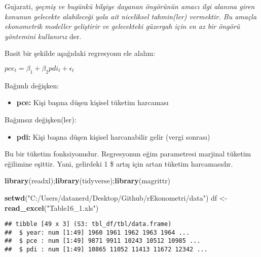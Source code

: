 \documentclass[
]{book}
\newenvironment{Shaded}{\begin{snugshade}}{\end{snugshade}}
\newcommand{\KeywordTok}[1]{\textcolor[rgb]{0.13,0.29,0.53}{\textbf{#1}}}
\newcommand{\NormalTok}[1]{#1}
\newcommand{\OperatorTok}[1]{\textcolor[rgb]{0.81,0.36,0.00}{\textbf{#1}}}
\newcommand{\StringTok}[1]{\textcolor[rgb]{0.31,0.60,0.02}{#1}}
\providecommand{\tightlist}{%
  \setlength{\itemsep}{0pt}\setlength{\parskip}{0pt}}
\begin{document}
Gujarati, \emph{geçmiş ve bugünkü bilgiye dayanan öngörünün amacı ilgi alanına giren konunun gelecekte alabileceği yola ait niceliksel tahmin(ler) vermektir. Bu amaçla ekonometrik modeller geliştirir ve gelecekteki güzergah için en az bir öngörü yöntemini kullanırız} der.

Basit bir şekilde aşağıdaki regresyonu ele alalım:

\(pce_t = \beta_1 + \beta_2pdi_t + \epsilon_t\)

Bağımlı değişken:

\begin{itemize}
\tightlist
\item
  \textbf{pce:} Kişi başına düşen kişisel tüketim harcaması
\end{itemize}

Bağımsız değişken(ler):

\begin{itemize}
\tightlist
\item
  \textbf{pdi:} Kişi başına düşen kişisel harcanabilir gelir (vergi sonrası)
\end{itemize}

Bu bir tüketim fonksiyonudur. Regresyonun eğim parametresi marjinal tüketim eğilimine eşittir. Yani, gelirdeki 1 \$ artış için artan tüketim harcamasıdır.

\begin{Shaded}
\begin{Highlighting}[]
\KeywordTok{library}\NormalTok{(readxl);}\KeywordTok{library}\NormalTok{(tidyverse);}\KeywordTok{library}\NormalTok{(magrittr)}

\KeywordTok{setwd}\NormalTok{(}\StringTok{"C:/Users/datanerd/Desktop/Github/rEkonometri/data"}\NormalTok{)}
\NormalTok{df <-}\StringTok{ }\KeywordTok{read_excel}\NormalTok{(}\StringTok{"Table16_1.xls"}\NormalTok{)}
\end{Highlighting}
\end{Shaded}

\begin{Shaded}
\end{Shaded}

\begin{verbatim}
## tibble [49 x 3] (S3: tbl_df/tbl/data.frame)
##  $ year: num [1:49] 1960 1961 1962 1963 1964 ...
##  $ pce : num [1:49] 9871 9911 10243 10512 10985 ...
##  $ pdi : num [1:49] 10865 11052 11413 11672 12342 ...
\end{verbatim}
\end{document}
